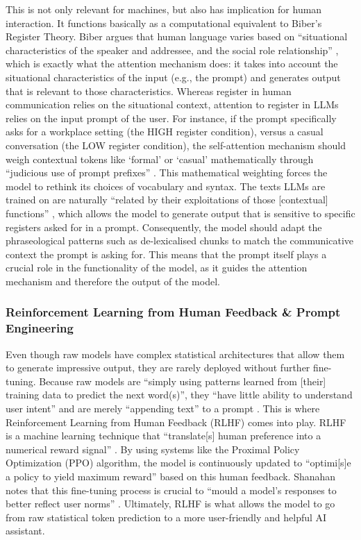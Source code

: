 \documentclass[11pt,a4paper]{article}
\begin{document}
This is not only relevant for machines, but also has implication for human interaction. It functions basically as a computational equivalent to Biber's Register Theory. Biber argues that human language varies based on ``situational characteristics of the speaker and addressee, and the social role relationship'' \parencite[38]{biber1988variation}, which is exactly what the attention mechanism does: it takes into account the situational characteristics of the input (e.g., the prompt) and generates output that is relevant to those characteristics. Whereas register in human communication relies on the situational context, attention to register in LLMs relies on the input prompt of the user. For instance, if the prompt specifically asks for a workplace setting (the HIGH register condition), versus a casual conversation (the LOW register condition), the self-attention mechanism should weigh contextual tokens like `formal' or `casual' mathematically through ``judicious use of prompt prefixes'' \parencite[4]{shanahanTalkingLargeLanguage2022}. This mathematical weighting forces the model to rethink its choices of vocabulary and syntax. The texts LLMs are trained on are naturally ``related by their exploitations of those [contextual] functions'' \parencite[36]{biber1988variation}, which allows the model to generate output that is sensitive to specific registers asked for in a prompt. Consequently, the model should adapt the phraseological patterns  such as de-lexicalised chunks to match the communicative context the prompt is asking for. This means that the prompt itself plays a crucial role in the functionality of the model, as it guides the attention mechanism and therefore the output of the model.


\subsubsection{Reinforcement Learning from Human Feedback \& Prompt Engineering}\label{subsubsec:rlhf-prompting}

Even though raw models have complex statistical architectures that allow them to generate impressive output, they are rarely deployed without further fine-tuning. Because raw models are ``simply using patterns learned from [their] training data to predict the next word(s)'', they ``have little ability to understand user intent'' and are merely ``appending text'' to a prompt \parencite{bergmannWhatReinforcementLearning2023}. This is where Reinforcement Learning from Human Feedback (RLHF) comes into play. RLHF is a machine learning technique that ``translate[s] human preference into a numerical reward signal'' \parencite{bergmannWhatReinforcementLearning2023}. By using systems like the Proximal Policy Optimization (PPO) algorithm, the model is continuously updated to ``optimi[s]e a policy to yield maximum reward'' \parencite{bergmannWhatReinforcementLearning2023} based on this human feedback. Shanahan notes that this fine-tuning process is crucial to ``mould a model's responses to better reflect user norms'' \parencite[10]{shanahanTalkingLargeLanguage2022}. Ultimately, RLHF is what allows the model to go from raw statistical token prediction to a more user-friendly and helpful AI assistant.
\end{document}
